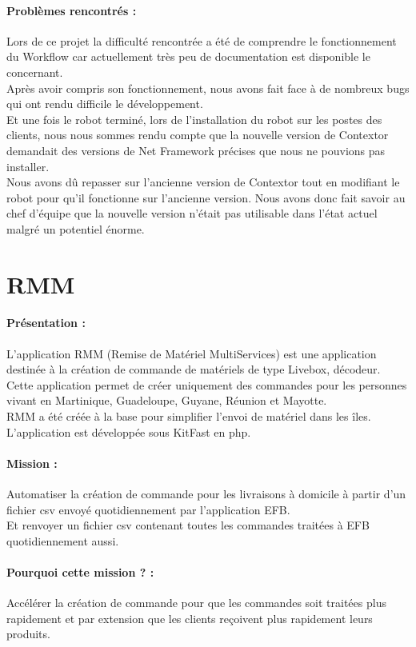 \documentclass[a4paper,twoside,12pt]{report}
\begin{document}
\paragraph {Problèmes rencontrés :} 
Lors de ce projet la difficulté rencontrée a été de comprendre le fonctionnement du Workflow car actuellement très peu de documentation est disponible le concernant.\\ Après avoir compris son fonctionnement, nous avons fait face à de nombreux bugs qui ont rendu difficile le développement.\\
Et une fois le robot terminé, lors de l'installation du robot sur les postes des clients, nous nous sommes rendu compte que la nouvelle version de Contextor demandait des versions de Net Framework précises que nous ne pouvions pas installer.\\
Nous avons dû repasser sur l'ancienne version de Contextor tout en modifiant le robot pour qu'il fonctionne sur l'ancienne version. Nous avons donc fait savoir au chef d'équipe que la nouvelle version n'était pas utilisable dans l'état actuel malgré un potentiel énorme.
\newpage
\section{RMM}
\vspace{1cm}
\paragraph {Présentation :}
L'application RMM (Remise de Matériel MultiServices) est une application destinée à la création de commande de matériels de type Livebox, décodeur.\\
Cette application permet de créer uniquement des commandes pour les personnes vivant en Martinique, Guadeloupe, Guyane, Réunion et Mayotte.\\
RMM a été créée à la base pour simplifier l'envoi de matériel dans les îles.\\
L'application est développée sous KitFast en php. 
\paragraph {Mission :} 
Automatiser la création de commande pour les livraisons à domicile à partir d'un fichier csv envoyé quotidiennement par l'application EFB.\\
Et renvoyer un fichier csv contenant toutes les commandes traitées à EFB quotidiennement aussi.
\paragraph {Pourquoi cette mission ? :}
Accélérer la création de commande pour que les commandes soit traitées plus rapidement et par extension que les clients reçoivent plus rapidement leurs produits.
\end{document}
